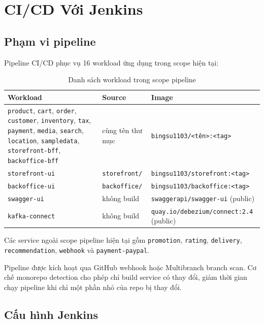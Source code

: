 \section{CI/CD Với Jenkins}

\subsection{Phạm vi pipeline}

Pipeline CI/CD phục vụ 16 workload ứng dụng trong scope hiện tại:

\begin{table}[H]
\centering
\caption{Danh sách workload trong scope pipeline}
\begin{tabular}{|p{}|p{}|p{}|}
\hline
\textbf{Workload} & \textbf{Source} & \textbf{Image} \\
\hline
\texttt{product}, \texttt{cart}, \texttt{order}, \texttt{customer}, \texttt{inventory}, \texttt{tax}, \texttt{payment}, \texttt{media}, \texttt{search}, \texttt{location}, \texttt{sampledata}, \texttt{storefront-bff}, \texttt{backoffice-bff} & cùng tên thư mục & \texttt{bingsu1103/<tên>:<tag>} \\
\hline
\texttt{storefront-ui} & \texttt{storefront/} & \texttt{bingsu1103/storefront:<tag>} \\
\texttt{backoffice-ui} & \texttt{backoffice/} & \texttt{bingsu1103/backoffice:<tag>} \\
\hline
\texttt{swagger-ui} & không build & \texttt{swaggerapi/swagger-ui} (public) \\
\texttt{kafka-connect} & không build & \texttt{quay.io/debezium/connect:2.4} (public) \\
\hline
\end{tabular}
\end{table}

Các service ngoài scope pipeline hiện tại gồm \texttt{promotion}, \texttt{rating}, \texttt{delivery}, \texttt{recommendation}, \texttt{webhook} và \texttt{payment-paypal}.

Pipeline được kích hoạt qua GitHub webhook hoặc Multibranch branch scan. Cơ chế monorepo detection cho phép chỉ build service có thay đổi, giảm thời gian chạy pipeline khi chỉ một phần nhỏ của repo bị thay đổi.

\subsection{Cấu hình Jenkins}

